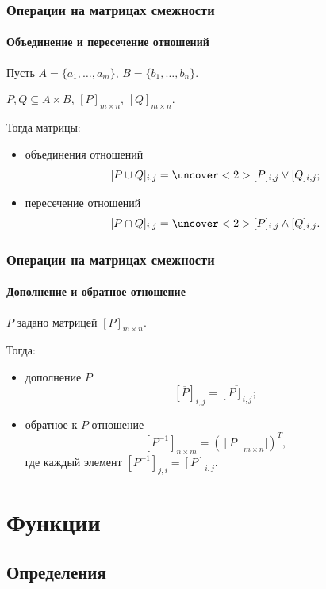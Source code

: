 \begin{frame}
    \frametitle{Операции на матрицах смежности}
    \framesubtitle{Объединение и пересечение отношений}
    
    Пусть $A=\{a_1,\ldots,a_m\}$, $B=\{b_1,\ldots,b_n\}$.
    
    $P,Q\subseteq A\times B$, $[P]_{m\times n}$, $[Q]_{m\times n}$.
    
    Тогда матрицы:
    \begin{itemize}
        \item объединения отношений
        \[
            [P\cup Q]_{i,j}=\uncover<2>{ [P]_{i,j}\lor [Q]_{i,j} };
        \]
        
        \item пересечение отношений
        \[
            [P\cap Q]_{i,j}=\uncover<2>{ [P]_{i,j}\land [Q]_{i,j} }.
        \]
    \end{itemize}
\end{frame}

\begin{frame}
    \frametitle{Операции на матрицах смежности}
    \framesubtitle{Дополнение и обратное отношение}
    
    $P$ задано матрицей $[P]_{m\times n}$.
    
    Тогда:
    \begin{itemize}
        \item дополнение $P$
        \[
            [\overline{P}]_{i,j}=\overline{ [P]_{i,j} };
        \]
        
        \item обратное к $P$ отношение
        \[
            [P^{-1}]_{n\times m}=([P]_{m\times n}])^{T}, 
        \]
        где каждый элемент $[P^{-1}]_{j,i}=[P]_{i,j}$.
    \end{itemize}
\end{frame}


\section{Функции}

\subsection{Определения}

